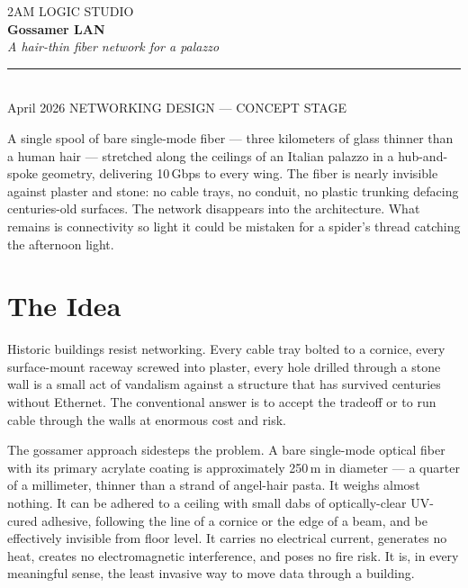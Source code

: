 \documentclass[10pt, letterpaper]{article}
\begin{document}
\thispagestyle{empty}

\begin{flushleft}
{\color{muted}\footnotesize\textsf{2AM LOGIC STUDIO}}\\[0.8em]
{\fontsize{26}{30}\selectfont\bfseries\color{ink}Gossamer LAN}\\[0.3em]
{\large\color{muted}\itshape A hair-thin fiber network for a palazzo}\\[0.7em]
{\color{rule}\rule{\textwidth}{2pt}}\\[0.2em]
{\footnotesize\color{muted}April 2026 \hfill NETWORKING DESIGN --- CONCEPT STAGE}
\end{flushleft}

\vspace{0.6em}

\begin{callout}[title=Premise]
A single spool of bare single-mode fiber --- three kilometers of glass thinner than a human hair --- stretched along the ceilings of an Italian palazzo in a hub-and-spoke geometry, delivering 10\,Gbps to every wing. The fiber is nearly invisible against plaster and stone: no cable trays, no conduit, no plastic trunking defacing centuries-old surfaces. The network disappears into the architecture. What remains is connectivity so light it could be mistaken for a spider's thread catching the afternoon light.
\end{callout}

\section{The Idea}

Historic buildings resist networking. Every cable tray bolted to a cornice, every surface-mount raceway screwed into plaster, every hole drilled through a stone wall is a small act of vandalism against a structure that has survived centuries without Ethernet. The conventional answer is to accept the tradeoff or to run cable through the walls at enormous cost and risk.

The gossamer approach sidesteps the problem. A bare single-mode optical fiber with its primary acrylate coating is approximately 250\,\textmu m in diameter --- a quarter of a millimeter, thinner than a strand of angel-hair pasta. It weighs almost nothing. It can be adhered to a ceiling with small dabs of optically-clear UV-cured adhesive, following the line of a cornice or the edge of a beam, and be effectively invisible from floor level. It carries no electrical current, generates no heat, creates no electromagnetic interference, and poses no fire risk. It is, in every meaningful sense, the least invasive way to move data through a building.
\end{document}

